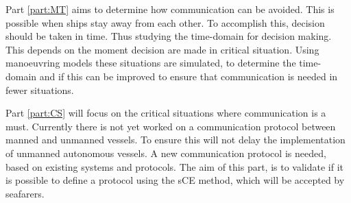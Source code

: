 Part \ref{part:MT} aims to determine how communication can be avoided. This is possible when ships stay away from each other. To accomplish this, decision should be taken in time. Thus studying the time-domain for decision making. This depends on the moment decision are made in critical situation. Using manoeuvring models these situations are simulated, to determine the time-domain and if this can be improved to ensure that communication is needed in fewer situations.

Part \ref{part:CS} will focus on the critical situations where communication is a must. Currently there is not yet worked on a communication protocol between manned and unmanned vessels. To ensure this will not delay the implementation of unmanned autonomous vessels. A new communication protocol is needed, based on existing systems and protocols. The aim of this part, is to validate if it is possible to define a protocol using the \acf{sCE} method, which will be accepted by seafarers.